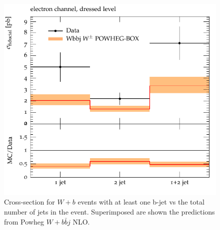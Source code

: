 \documentclass[11pt]{cernrep} \usepackage{graphicx,epsfig} 
\begin{document}
\begin{figure}[htbp]
\begin{center}
   \includegraphics[scale=0.65]{figs/wbb/powheg/d01-x01-y01.pdf}
\end{center}
\caption{Cross-section for $W+b$ events with at least one b-jet vs the total number of jets in the event. Superimposed are
shown the predictions from Powheg $W+b\bar{b}j$ NLO.}
\label{wbb-njet-powheg}
\end{figure}
\end{document}
